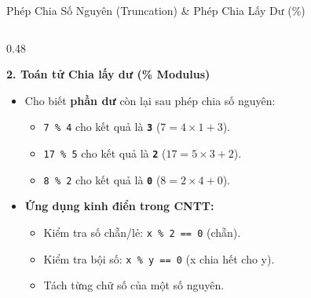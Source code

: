 \documentclass[aspectratio=169, 10pt]{beamer}
\begin{document}
\begin{frame}{Phép Chia Số Nguyên (Truncation) \& Phép Chia Lấy Dư (\%)}
\begin{columns}[T]
    \begin{column}{0.48\textwidth}
      \begin{exampleblock}{\textbf{2. Toán tử Chia lấy dư (\% Modulus)}}
        \begin{itemize}\small
          \item Cho biết \textbf{phần dư} còn lại sau phép chia số nguyên:
            \begin{itemize}\small
              \item \texttt{7 \% 4} cho kết quả là \textbf{\texttt{3}} ($7 = 4 \times 1 + 3$).
              \item \texttt{17 \% 5} cho kết quả là \textbf{\texttt{2}} ($17 = 5 \times 3 + 2$).
              \item \texttt{8 \% 2} cho kết quả là \textbf{\texttt{0}} ($8 = 2 \times 4 + 0$).
            \end{itemize}
          \item \textbf{Ứng dụng kinh điển trong CNTT:}
            \begin{itemize}\scriptsize
              \item Kiểm tra số chẵn/lẻ: \texttt{x \% 2 == 0} (chẵn).
              \item Kiểm tra bội số: \texttt{x \% y == 0} (x chia hết cho y).
              \item Tách từng chữ số của một số nguyên.
            \end{itemize}
        \end{itemize}
      \end{exampleblock}
    \end{column}
  \end{columns}
\end{frame}
\end{document}
